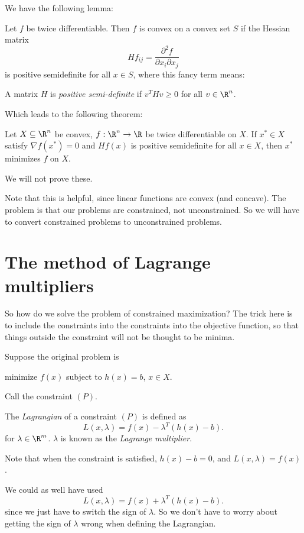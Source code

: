 \documentclass[a4paper]{article}
\begin{document}
We have the following lemma:
\begin{lemma}
  Let $f$ be twice differentiable. Then $f$ is convex on a convex set $S$ if the Hessian matrix
  \[
    Hf_{ij} = \frac{\partial^2 f}{\partial x_i \partial x_j}
  \]
  is positive semidefinite for all $x\in S$, where this fancy term means:
\end{lemma}

\begin{defi}
  A matrix $H$ is \emph{positive semi-definite} if $v^T Hv \geq 0$ for all $v\in \R^n$.
\end{defi}

Which leads to the following theorem:
\begin{thm}
  Let $X\subseteq \R^n$ be convex, $f: \R^n \to \R$ be twice differentiable on $X$. If $x^* \in X$ satisfy $\nabla f(x^*) = 0$ and $Hf(x)$ is positive semidefinite for all $x\in X$, then $x^*$ minimizes $f$ on $X$.
\end{thm}
We will not prove these.

Note that this is helpful, since linear functions are convex (and concave). The problem is that our problems are constrained, not unconstrained. So we will have to convert constrained problems to unconstrained problems.

\section{The method of Lagrange multipliers}
So how do we solve the problem of constrained maximization? The trick here is to include the constraints into the constraints into the objective function, so that things outside the constraint will not be thought to be minima.

Suppose the original problem is
\begin{center}
  minimize $f(x)$ subject to $h(x) = b$, $x\in X$.
\end{center}
Call the constraint $(P)$.
\begin{defi}[Lagrangian]
  The \emph{Lagrangian} of a constraint $(P)$ is defined as
  \[
    L(x, \lambda) = f(x) - \lambda^T(h(x) - b).
  \]
  for $\lambda\in \R^m$. $\lambda$ is known as the \emph{Lagrange multiplier}.
\end{defi}
Note that when the constraint is satisfied, $h(x) - b = 0$, and $L(x, \lambda) = f(x)$.

We could as well have used
\[
  L(x, \lambda) = f(x) + \lambda^T(h(x) - b).
\]
since we just have to switch the sign of $\lambda$. So we don't have to worry about getting the sign of $\lambda$ wrong when defining the Lagrangian.
\end{document}

